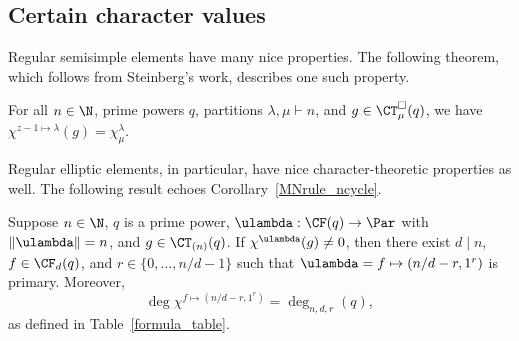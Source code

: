 \subsection{Certain character values}

Regular semisimple elements have many nice properties. The following theorem, which follows from Steinberg's work, describes one such property.
\begin{theorem}
\label{sn_stuff}
For all \(n \in \N\), prime powers \(q\), partitions \(\lambda, \mu \vdash n\), and \(g \in \CT_\mu^\Box (q)\), we have \(\chi^{z-1 \mapsto \lambda} (g) = \chi^\lambda_\mu\).
\end{theorem}

Regular elliptic elements, in particular, have nice character-theoretic properties as well.
The following result echoes Corollary~\ref{MNrule_ncycle}.
\begin{corollary}
\label{reg_ell_chi}
Suppose \(n \in \N\), \(q\) is a prime power, \(\ulambda : \CF(q) \to \Par\) with \(\|\ulambda\| = n\), and \(g \in \CT_{(n)} (q)\).
If \(\chi^\ulambda (g) \neq 0\), then there exist \(d \mid n\), \(f \in \CF_d (q)\), and \(r \in \{0,\ldots,n/d-1\}\) such that \(\ulambda = f \mapsto (n/d - r, 1^r)\) is primary.
Moreover,
\begin{equation}
\deg \chi^{f \mapsto (n/d-r,1^r)} = \deg_{n,d,r} (q),
\end{equation}
as defined in Table~\ref{formula_table}.
\end{corollary}

